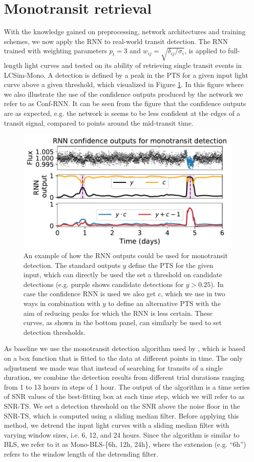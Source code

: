\section{Monotransit retrieval}
\label{sec:monos}

With the knowledge gained on preprocessing, network architectures and training schemes, we now apply the RNN to real-world transit detection. The RNN trained with weighting parameters $p_t=3$ and $w_{ij} = \sqrt{\delta_{ij}/\sigma_i}$, is applied to full-length light curves and tested on its ability of retrieving single transit events in LCSim-Mono. A detection is defined by a peak in the PTS for a given input light curve above a given threshold, which visualized in Figure \ref{fig:mono_example}. In this figure where we also illustrate the use of the confidence outputs produced by the network we refer to as Conf-RNN. It can be seen from the figure that the confidence outputs are as expected, e.g. the network is seems to be less confident at the edges of a transit signal, compared to points around the mid-transit time.

\begin{figure}
    \centering
    \includegraphics[width=0.5\linewidth]{Experiments/Figures/Monos/mono_example.pdf}
    \caption{An example of how the RNN outputs could be used for monotransit detection. The standard outputs $y$ define the PTS for the given input, which can directly be used the set a threshold on candidate detections (e.g. purple shows candidate detections for $y >0.25$). In case the confidence RNN is used we also get $c$, which we use in two ways in combination with $y$ to define an alternative PTS with the aim of reducing peaks for which the RNN is less certain. These curves, as shown in the bottom panel, can similarly be used to set detection thresholds.}
    \label{fig:mono_example}
\end{figure}

As baseline we use the monotransit detection algorithm used by \cite{foreman2016population}, which is based on a box function that is fitted to the data at different points in time. The only adjustment we made was that instead of searching for transits of a single duration, we combine the detection results from different trial durations ranging from 1 to 13 hours in steps of 1 hour. The output of the algorithm is a time series of SNR values of the best-fitting box at each time step, which we will refer to as SNR-TS. We set a detection threshold on the SNR above the noise floor in the SNR-TS, which is computed using a sliding median filter. Before applying this method, we detrend the input light curves with a sliding median filter with varying window sizes, i.e. 6, 12, and 24 hours. Since the algorithm is similar to BLS, we refer to it as Mono-BLS-\{6h, 12h, 24h\}, where the extension (e.g. ``6h'') refers to the window length of the detrending filter.

